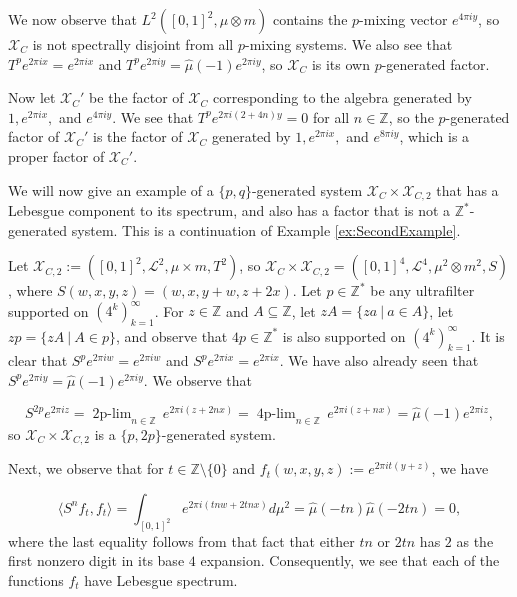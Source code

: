 \documentclass[graybox]{svmult}
\theoremstyle{definition}
\newcommand{\Z}{\mathbb{Z}}
\newcommand{\plimgG}[3]{\mathop {#1\text{-lim}}_{#2\in #3}\,}
\begin{document}
\begin{example}
    We now observe that $L^2([0,1]^2,\mu\otimes m)$ contains the $p$-mixing vector $e^{4\pi iy}$, so $\mathcal{X}_C$ is not spectrally disjoint from all $p$-mixing systems.
    We also see that $T^pe^{2\pi ix} = e^{2\pi ix}$ and $T^pe^{2\pi iy} = \widehat{\mu}(-1)e^{2\pi iy}$, so $\mathcal{X}_C$  is its own $p$-generated factor.
    
    Now let $\mathcal{X}_C'$ be the factor of $\mathcal{X}_C$ corresponding to the algebra generated by $1,e^{2\pi ix},$ and $e^{4\pi iy}$.
    We see that $T^pe^{2\pi i(2+4n)y} = 0$ for all $n \in \mathbb{Z}$, so the $p$-generated factor of $\mathcal{X}_C'$ is the factor of $\mathcal{X}_C$ generated by $1,e^{2\pi ix},$ and $e^{8\pi iy}$, which is a proper factor of $\mathcal{X}_C'$.
\end{example}

\begin{example}\label{ex:ThirdExample}
    We will now give an example of a $\{p,q\}$-generated system $\mathcal{X}_C\times\mathcal{X}_{C,2}$ that has a Lebesgue component to its spectrum, and also has a factor that is not a $\mathbb{Z}^*$-generated system.
    This is a continuation of Example \ref{ex:SecondExample}.

    Let $\mathcal{X}_{C,2} := ([0,1]^2,\mathscr{L}^2,\mu\times m,T^2)$, so $\mathcal{X}_C\times\mathcal{X}_{C,2} = ([0,1]^4,\mathscr{L}^4,\mu^2\otimes m^2,S)$, where $S(w,x,y,z) = (w,x,y+w,z+2x)$.
    Let $p \in \mathbb{Z}^*$ be any ultrafilter supported on $(4^k)_{k = 1}^\infty$.
    For $z \in \mathbb{Z}$ and $A \subseteq \mathbb{Z}$, let $zA = \{za\ |\ a \in A\}$, let $zp = \{zA\ |\ A \in p\}$, and observe that $4p \in \mathbb{Z}^*$ is also supported on $(4^k)_{k = 1}^\infty$.
    It is clear that $S^pe^{2\pi iw} = e^{2\pi iw}$ and $S^pe^{2\pi ix} = e^{2\pi ix}$.
    We have also already seen that $S^pe^{2\pi iy} = \widehat{\mu}(-1)e^{2\pi iy}$.
    We observe that

    \begin{equation}
        S^{2p}e^{2\pi iz} = \plimgG{2p}{n}{\Z}e^{2\pi i(z+2nx)} = \plimgG{4p}{n}{\Z}e^{2\pi i(z+nx)} = \widehat{\mu}(-1)e^{2\pi iz},
    \end{equation}
    so $\mathcal{X}_C\times\mathcal{X}_{C,2}$ is a $\{p,2p\}$-generated system.

    Next, we observe that for $t \in \mathbb{Z}\setminus\{0\}$ and $f_t(w,x,y,z) := e^{2\pi it(y+z)}$, we have

    \begin{equation}
        \langle S^nf_t,f_t\rangle = \int_{[0,1]^2}e^{2\pi i(tnw+2tnx)}d\mu^2 = \widehat{\mu}(-tn)\widehat{\mu}(-2tn) = 0,
    \end{equation}
    where the last equality follows from that fact that either $tn$ or $2tn$ has $2$ as the first nonzero digit in its base $4$ expansion.
    Consequently, we see that each of the functions $f_t$ have Lebesgue spectrum.


\end{example}
\end{document}
